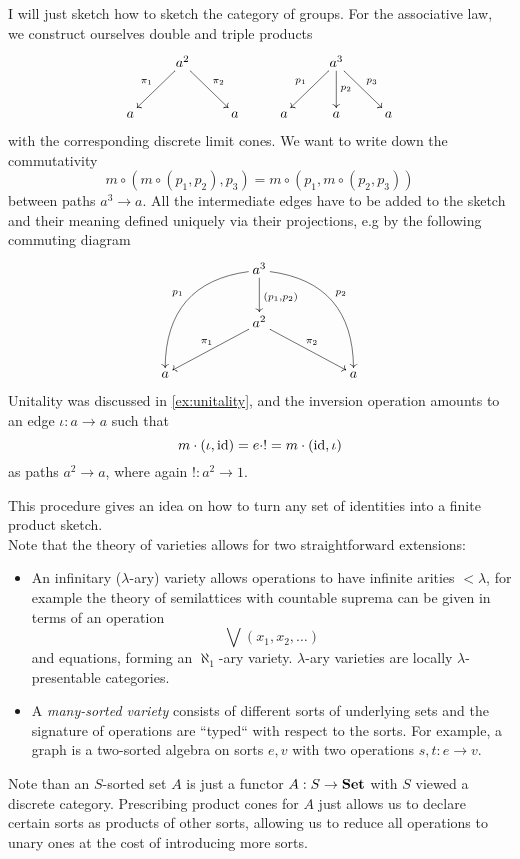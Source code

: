 \begin{Example}[Groups]
I will just sketch how to sketch the category of groups. For the associative law, we construct ourselves double and triple products
\[
\xymatrix{
  & a^2 \ar[ld]_{\pi_1} \ar[rd]^{\pi_2} &    & & a^3 \ar[ld]_{p_1} \ar[d]^{p_2} \ar[rd]^{p_3} & \\
a &     & a & a & a & a
}\]
with the corresponding discrete limit cones. We want to write down the commutativity
\[ m \circ (m \circ (p_1, p_2), p_3) = m \circ (p_1, m \circ (p_2,p_3)) \]
between paths $a^3 \to a$. All the intermediate edges have to be added to the sketch and their meaning defined uniquely via their projections, e.g by the following commuting diagram
\[
\xymatrix{
& & a^3 \ar[d]^{(p_1,p_2)} \ar@/_2pc/[lldd]_{p_1} \ar@/^2pc/[rrdd]^{p_2} & \\
& & a^2 \ar[lld]_{\pi_1} \ar[rrd]^{\pi_2} & \\
a & & & & a
}\]
Unitality was discussed in \ref{ex:unitality}, and the inversion operation amounts to an edge $\iota : a \to a$ such that \[ m \cdot (\iota, \textrm{id}) = e \cdot ! = m \cdot (\textrm{id}, \iota) \]
as paths $a^2 \to a$, where again $!: a^2 \to 1$. 
\end{Example}

This procedure gives an idea on how to turn any set of identities into a finite product sketch. \\

Note that the theory of varieties allows for two straightforward extensions: 

\begin{itemize}
\item An infinitary ($\lambda$-ary) variety allows operations to have infinite arities $< \lambda$, for example the theory of semilattices with countable suprema can be given in terms of an operation
\[ \bigvee(x_1, x_2, \ldots) \]
and equations, forming an $\aleph_1$-ary variety. $\lambda$-ary varieties are locally $\lambda$-presentable categories.

\item A \emph{many-sorted variety} consists of different sorts of underlying sets and the signature of operations are ``typed`` with respect to the sorts. For example, a graph is a two-sorted algebra on sorts $e,v$ with two operations $s, t : e \to v$. 
\end{itemize}

Note than an $S$-sorted set $A$ is just a functor $A : S \to \mathbf{Set}$ with $S$ viewed a discrete category. Prescribing product cones for $A$ just allows us to declare certain sorts as products of other sorts, allowing us to reduce all operations to unary ones at the cost of introducing more sorts.
 
